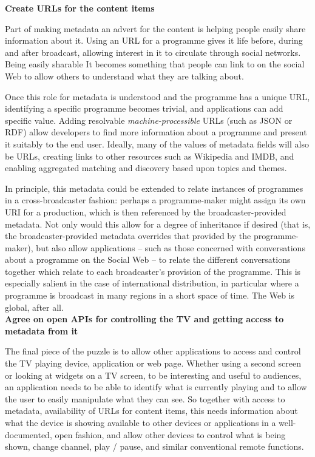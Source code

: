 \documentclass[]{article}%
\begin{document}
{\bf{Create URLs for the content items}}

Part of making metadata an advert for the content is helping people easily share information about it. Using an URL for a programme gives it life before, during and after broadcast, allowing interest in it to circulate through social networks. Being easily sharable It becomes something that people can link to on the social Web to allow others to understand what they are talking about. 

Once this role for metadata is understood and the programme has a unique URL, identifying a specific programme becomes trivial, and applications can add specific value. Adding resolvable {\em{machine-processible}} URLs (such as JSON or RDF) allow developers to find more information about a programme and present it suitably to the end user. Ideally, many of the values of metadata fields will also be URLs, creating links to other resources such as Wikipedia and IMDB, and enabling aggregated matching and discovery based upon topics and themes.

In principle, this metadata could be extended to relate instances of programmes in a cross-broadcaster fashion: perhaps a programme-maker might assign its own URI for a production, which is then referenced by the broadcaster-provided metadata. Not only would this allow for a degree of inheritance if desired (that is, the broadcaster-provided metadata overrides that provided by the programme-maker), but also allow applications -- such as those concerned with conversations about a programme on the Social Web -- to relate the different conversations together which relate to each broadcaster's provision of the programme.  This is especially salient in the case of international distribution, in particular where a programme is broadcast in many regions in a short space of time. The Web is global, after all.
\\

{\bf{Agree on open APIs for controlling the TV and getting access to metadata from it}}

The final piece of the puzzle is to allow other applications to access and control the TV playing device, application or web page. Whether using a second screen or looking at widgets on a TV screen, to be interesting and useful to audiences, an application needs to be able to identify what is currently playing and to allow the user to easily manipulate what they can see. So together with access to metadata, availability of URLs for content items, this needs information about what the device is showing available to other devices or applications in a well-documented, open fashion, and allow other devices to control what is being shown, change channel, play / pause, and similar conventional remote functions.
\end{document}
